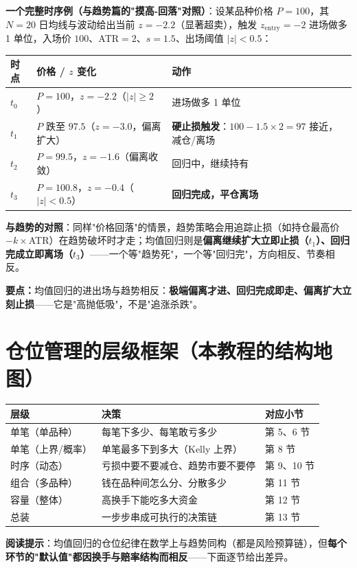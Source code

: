 \documentclass[UTF8,11pt]{ctexart}
\newcommand{\takeaway}[1]{\medskip\par\noindent\textbf{要点：}#1\par\medskip}
\begin{document}
\textbf{一个完整时序例（与趋势篇的"摸高-回落"对照）}：设某品种价格 $P=100$，其 $N=20$ 日均线与波动给出当前 $z=-2.2$（显著超卖），触发 $z_{\text{entry}}=-2$ 进场做多 1 单位，入场价 $100$、ATR$=2$、$s=1.5$、出场阈值 $|z|<0.5$：
\begin{center}
\renewcommand{\arraystretch}{1.3}
\begin{tabular}{@{}lll@{}}
\toprule
时点 & 价格 / $z$ 变化 & 动作 \\
\midrule
$t_0$ & $P=100$，$z=-2.2$（$|z|\ge2$） & 进场做多 1 单位 \\
$t_1$ & $P$ 跌至 $97.5$（$z=-3.0$，偏离扩大） & \textbf{硬止损触发}：$100-1.5\times2=97$ 接近，减仓/离场 \\
$t_2$ & $P=99.5$，$z=-1.6$（偏离收敛） & 回归中，继续持有 \\
$t_3$ & $P=100.8$，$z=-0.4$（$|z|<0.5$） & \textbf{回归完成，平仓离场} \\
\bottomrule
\end{tabular}
\end{center}
\textbf{与趋势的对照}：同样"价格回落"的情景，趋势策略会用追踪止损（如持仓最高价 $-k\times$ATR）在趋势破坏时才走；均值回归则是\textbf{偏离继续扩大立即止损（$t_1$）、回归完成立即离场（$t_3$）}——一个等"趋势死"，一个等"回归完"，方向相反、节奏相反。

\takeaway{均值回归的进出场与趋势相反：\textbf{极端偏离才进、回归完成即走、偏离扩大立刻止损}——它是"高抛低吸"，不是"追涨杀跌"。}

\section{仓位管理的层级框架（本教程的结构地图）}
\begin{center}
\renewcommand{\arraystretch}{1.45}
\begin{tabular}{@{}lll@{}}
\toprule
层级 & 决策 & 对应小节 \\
\midrule
单笔（单品种） & 每笔下多少、每笔敢亏多少 & 第 5、6 节 \\
单笔（上界/概率） & 单笔最多下到多大（Kelly 上界） & 第 8 节 \\
时序（动态） & 亏损中要不要减仓、趋势市要不要停 & 第 9、10 节 \\
组合（多品种） & 钱在品种间怎么分、分散多少 & 第 11 节 \\
容量（整体） & 高换手下能吃多大资金 & 第 12 节 \\
总装 & 一步步串成可执行的决策链 & 第 13 节 \\
\bottomrule
\end{tabular}
\end{center}
\textbf{阅读提示}：均值回归的仓位纪律在数学上与趋势同构（都是风险预算链），但\textbf{每个环节的"默认值"都因换手与赔率结构而相反}——下面逐节给出差异。
\end{document}
